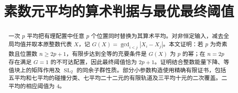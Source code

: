\documentclass[11pt,a4paper]{article}
\title{素数元平均的算术判据与最优最终阈值}
\author{}
\date{}
\newcommand{\SL}{\operatorname{SL}}
\theoremstyle{definition}
\numberwithin{equation}{section}
\begin{document}
\maketitle
\begin{abstract}
一次 $p$ 平均把有理配置中任意 $p$ 个位置同时替换为其算术平均。对非恒定输入，减去全局均值并取本原整数代表 $X$，记 $G(X)=\gcd_{i<j}|X_i-X_j|$。本文证明：若 $p$ 为奇素数且位置数 $n\ge2p+1$，有限步达到全等的充要条件是 $G(X)$ 为 $p$ 的幂；在 $n=2p$ 存在满足 $G=1$ 的不可达配置，因此最终阈值恰为 $2p+1$。证明结合整数能量下降、等值块上的矩阵作用及 $\SL_2$ 的同余子群性质。部分小参数构造使用精确有限证书，包括五平均和七平均的碰撞分类、七平均二十二元的有限轨道及三平均十元的二次覆盖。二平均的相应阈值为 $4$。
\end{abstract}
\tableofcontents
\end{document}
